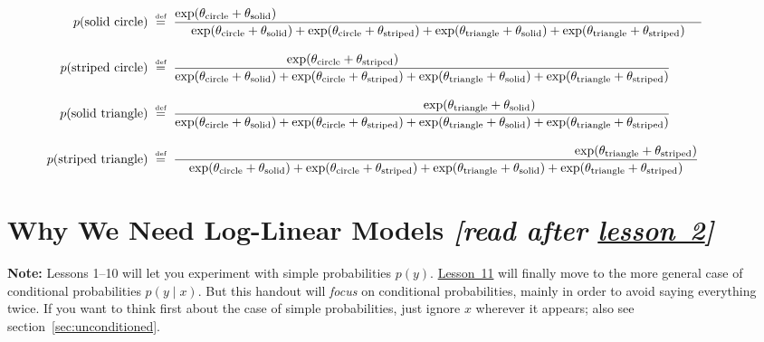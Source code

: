 \documentclass[11pt]{article}
\newcommand{\defeq}{\;\stackrel{\mbox{\tiny def}}{=}\;}
\newcommand{\lesson}[1]{\href{http://cs.jhu.edu/~jason/tutorials/loglin/\##1}{lesson~#1}}
\newcommand{\Lesson}[1]{\href{http://cs.jhu.edu/~jason/tutorials/loglin/\##1}{Lesson~#1}}
\begin{document}
\begin{align*}
\hspace{-12mm}p(\text{solid circle}) & \defeq \frac{\exp (\theta_{\textrm{circle}}+\theta_{\textrm{solid}})\hspace{118mm}}{\exp (\theta_{\textrm{circle}} + \theta_{\textrm{solid}}) + \exp (\theta_{\textrm{circle}} + \theta_{\textrm{striped}}) + \exp (\theta_{\textrm{triangle}} + \theta_{\textrm{solid}}) + \exp (\theta_{\textrm{triangle}} + \theta_{\textrm{striped}})} \\
\rule{0in}{1.5\baselineskip}
\hspace{-12mm}p(\text{striped circle}) & \defeq \frac{\exp (\theta_{\textrm{circle}}+\theta_{\textrm{striped}})\hspace{44mm}}{\exp (\theta_{\textrm{circle}} + \theta_{\textrm{solid}}) + \exp (\theta_{\textrm{circle}} + \theta_{\textrm{striped}}) + \exp (\theta_{\textrm{triangle}} + \theta_{\textrm{solid}}) + \exp (\theta_{\textrm{triangle}} + \theta_{\textrm{striped}})} \\
\rule{0in}{1.5\baselineskip}
\hspace{-12mm}p(\text{solid triangle}) & \defeq \frac{\hspace{32mm}\exp (\theta_{\textrm{triangle}}+\theta_{\textrm{solid}})}{\exp (\theta_{\textrm{circle}} + \theta_{\textrm{solid}}) + \exp (\theta_{\textrm{circle}} + \theta_{\textrm{striped}}) + \exp (\theta_{\textrm{triangle}} + \theta_{\textrm{solid}}) + \exp (\theta_{\textrm{triangle}} + \theta_{\textrm{striped}})} \\
\rule{0in}{1.5\baselineskip}
\hspace{-12mm}p(\text{striped triangle}) & \defeq \frac{\hspace{111mm}\exp (\theta_{\textrm{triangle}}+\theta_{\textrm{striped}})}{\exp (\theta_{\textrm{circle}} + \theta_{\textrm{solid}}) + \exp (\theta_{\textrm{circle}} + \theta_{\textrm{striped}}) + \exp (\theta_{\textrm{triangle}} + \theta_{\textrm{solid}}) + \exp (\theta_{\textrm{triangle}} + \theta_{\textrm{striped}})}
\end{align*}

\section{Why We Need Log-Linear Models {\em [read after \lesson{2}]}}

{\bf Note:} Lessons 1--10 will let you experiment with simple
probabilities $p(y)$.  \Lesson{11} will finally move to the more general
case of conditional probabilities $p(y\mid x)$.  But this handout will
{\em focus} on conditional probabilities, mainly in order to avoid saying
everything twice.  If you want to think first about the case of simple
probabilities, just ignore $x$ wherever it appears; also see
section~\ref{sec:unconditioned}.
\end{document}
